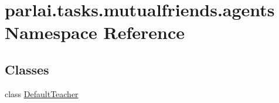 \hypertarget{namespaceparlai_1_1tasks_1_1mutualfriends_1_1agents}{}\section{parlai.\+tasks.\+mutualfriends.\+agents Namespace Reference}
\label{namespaceparlai_1_1tasks_1_1mutualfriends_1_1agents}
\subsection*{Classes}
\begin{DoxyCompactItemize}
\item 
class \hyperlink{classparlai_1_1tasks_1_1mutualfriends_1_1agents_1_1DefaultTeacher}{Default\+Teacher}
\end{DoxyCompactItemize}
